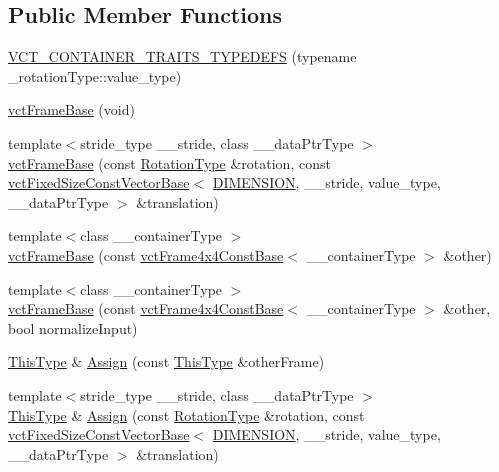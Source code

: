 \subsection*{Public Member Functions}
\begin{DoxyCompactItemize}
\item 
\hyperlink{classvct_frame_base_ae7a91d89635167df941960b1d087ae00}{V\-C\-T\-\_\-\-C\-O\-N\-T\-A\-I\-N\-E\-R\-\_\-\-T\-R\-A\-I\-T\-S\-\_\-\-T\-Y\-P\-E\-D\-E\-F\-S} (typename \-\_\-rotation\-Type\-::value\-\_\-type)
\item 
\hyperlink{classvct_frame_base_ac8a48dafaeb69f31b2bc40ba16ec8904}{vct\-Frame\-Base} (void)
\item 
{\footnotesize template$<$stride\-\_\-type \-\_\-\-\_\-stride, class \-\_\-\-\_\-data\-Ptr\-Type $>$ }\\\hyperlink{classvct_frame_base_a738a33cec4b25a85c5f2853e0266bf29}{vct\-Frame\-Base} (const \hyperlink{classvct_frame_base_a02e4eaad478400dd1d81e772caf3b01b}{Rotation\-Type} \&rotation, const \hyperlink{classvct_fixed_size_const_vector_base}{vct\-Fixed\-Size\-Const\-Vector\-Base}$<$ \hyperlink{classvct_frame_base_a4284a4e875533c13df90a20c0233e043ad25b85efd5e4c2687ddf38ae18cd88f0}{D\-I\-M\-E\-N\-S\-I\-O\-N}, \-\_\-\-\_\-stride, value\-\_\-type, \-\_\-\-\_\-data\-Ptr\-Type $>$ \&translation)
\item 
{\footnotesize template$<$class \-\_\-\-\_\-container\-Type $>$ }\\\hyperlink{classvct_frame_base_ad7c8211c2c810a607f93bc8b923c8125}{vct\-Frame\-Base} (const \hyperlink{classvct_frame4x4_const_base}{vct\-Frame4x4\-Const\-Base}$<$ \-\_\-\-\_\-container\-Type $>$ \&other)
\item 
{\footnotesize template$<$class \-\_\-\-\_\-container\-Type $>$ }\\\hyperlink{classvct_frame_base_a7082e42b3f5e93310c98ac89cc16e571}{vct\-Frame\-Base} (const \hyperlink{classvct_frame4x4_const_base}{vct\-Frame4x4\-Const\-Base}$<$ \-\_\-\-\_\-container\-Type $>$ \&other, bool normalize\-Input)
\item 
\hyperlink{classvct_frame_base_a076f1fe4fc957faa0d1ff7450d1cb768}{This\-Type} \& \hyperlink{classvct_frame_base_aa24c98e6e6cd9edc199148214b84f4c0}{Assign} (const \hyperlink{classvct_frame_base_a076f1fe4fc957faa0d1ff7450d1cb768}{This\-Type} \&other\-Frame)
\item 
{\footnotesize template$<$stride\-\_\-type \-\_\-\-\_\-stride, class \-\_\-\-\_\-data\-Ptr\-Type $>$ }\\\hyperlink{classvct_frame_base_a076f1fe4fc957faa0d1ff7450d1cb768}{This\-Type} \& \hyperlink{classvct_frame_base_ace948997b56ff592340a9811c2a34657}{Assign} (const \hyperlink{classvct_frame_base_a02e4eaad478400dd1d81e772caf3b01b}{Rotation\-Type} \&rotation, const \hyperlink{classvct_fixed_size_const_vector_base}{vct\-Fixed\-Size\-Const\-Vector\-Base}$<$ \hyperlink{classvct_frame_base_a4284a4e875533c13df90a20c0233e043ad25b85efd5e4c2687ddf38ae18cd88f0}{D\-I\-M\-E\-N\-S\-I\-O\-N}, \-\_\-\-\_\-stride, value\-\_\-type, \-\_\-\-\_\-data\-Ptr\-Type $>$ \&translation)

\end{DoxyCompactItemize}
